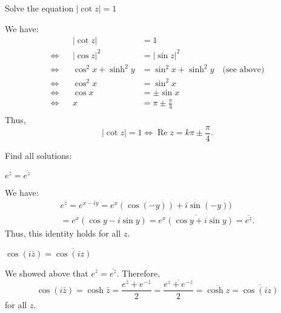 \documentclass[answers, 12pt]{exam}
\renewcommand{\Re}{\operatorname{Re}}
\begin{document}
\begin{questions}
\question Solve the equation $|\cot z|=1$
    \begin{solution}
        We have:
        \begin{align*}
            &
            &|\cot z| &= 1\\
            \Longleftrightarrow&
            &|\cos z|^2 &= |\sin z|^2\\
            \Longleftrightarrow&
            &\cos^2 x+\sinh^2 y &= \sin^2 x+ \sinh^2 y\quad\text{(see above)}\\
            \Longleftrightarrow&
            &\cos^2 x &= \sin^2 x\\
            \Longleftrightarrow&
            &\cos x &= \pm \sin x\\
            \Longleftrightarrow&
            & x &= \pi \pm \frac\pi4\\
        \end{align*}
        Thus,
        \[
            |\cot z| = 1\Longleftrightarrow\Re z = k\pi \pm \frac\pi4.
        \]
    \end{solution}

    \question
Find all solutions:
\begin{parts}
    \item $e^{\bar{z}}=\overline{e^z}$
    \begin{solution}
        We have:
        \begin{multline*}
            e^{\bar z} = e^{x-iy} = e^x(\cos(-y)) + i\sin(-y))\\ = e^x(\cos y - i\sin y) = 
            \overline{e^x(\cos y + i\sin y)} = \overline{e^z}.
        \end{multline*}
        Thus, this identity holds for all $z$.
    \end{solution}

    \item $\cos(i\bar z) = \overline{\cos(iz)}$
    \begin{solution}
        We showed above that $e^{\bar z} = \overline{e^z}$. Therefore,
        \[
            \cos(i\bar z) = \cosh\bar z = \frac{e^{\bar z} + e^{-\bar z}}2
            = \overline{\frac{e^{z} + e^{- z}}2}
            = \overline{\cosh z}
            = \overline{\cos(iz)}
        \]
        for all $z$.
    \end{solution}

    
\end{parts}


\end{questions}
\end{document}
